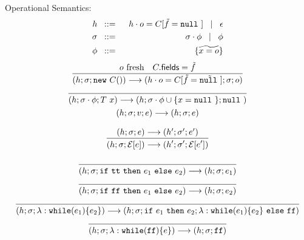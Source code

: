\documentclass[a4paper]{llncs}
\newcommand{\nul}{\ensuremath{\mathtt{null}\ }}
\newcommand{\vdecl}[2]{#1\ #2}
\newcommand{\newo}[1]{\ensuremath{\mathtt{new}\ #1()}}
\newcommand{\while}[2]{\ensuremath{\mathtt{while}(#1)\set{#2}}}
\newcommand{\econtext}[2]{\mathcal{#1}[#2]}
\begin{document}
%
	Operational Semantics:
%
	\begin{eqnarray*}
		h &\bnfis& h \cat o = C[\vect{f} = \vec{\nul}] \bnfbar \epsilon\\
		\sigma &\bnfis& \sigma \cat \phi \bnfbar \phi\\
		\phi &\bnfis& \set{\widetilde{x = o}}
	\end{eqnarray*}
%
\[
	\begin{array}{c}
		\tree{
			o\ \textrm{fresh} \quad C.\mathsf{fields} = \vect{f}
		}{
			(h; \sigma; \newo{C}) \red (h \cat o = C[\vect{f} = \vect{\nul}]; \sigma; o)
		}\\[4mm]
		\tree{
		}{
			(h; \sigma \cat \phi; \vdecl{T}{x}) \red (h; \sigma \cat \phi \cup \set{x = \nul}; \nul)
		}\\[4mm]
			(h; \sigma; v; e) \red (h; \sigma; e)
		\\[4mm]
		\tree{
			(h; \sigma; e) \red (h'; \sigma'; e')
		}{
			(h; \sigma; \econtext{E}{e}) \red (h'; \sigma'; \econtext{E}{e'})
		}
		\\
		\\

		\tree{
		}{
			(h; \sigma; \ifthenelse{\true}{e_1}{e_2}) \red (h; \sigma; e_1)
		}\\[4mm]

		\tree{
		}{
			(h; \sigma; \ifthenelse{\false}{e_1}{e_2}) \red (h; \sigma; e_2)
		}\\[4mm]

		\tree{
		}{
			(h; \sigma; \lambda: \while{e_1}{e_2}) \red (h; \sigma; \ifthenelse{e_1}{e_2;\lambda: \while{e_1}{e_2}}{\false})
		}\\[4mm]

		\tree{
		}{
			(h; \sigma; \lambda: \while{\false}{e}) \red (h; \sigma; \false)
		}
	\end{array}
\]
%



%
\end{document}
